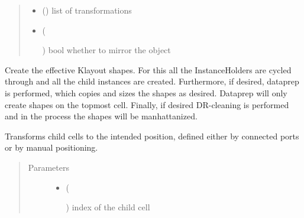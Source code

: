 \documentclass[a4paper,10pt,english]{sphinxmanual}
\begin{document}
\begin{fulllineitems}
\begin{fulllineitems}
\begin{quote}
\begin{description}
\begin{itemize}
\item {} 
 () \textendash{} list of transformations

\item {} 
 (%
\begin{footnote}[59]\sphinxAtStartFootnote
{}
%
\end{footnote}) \textendash{} bool whether to mirror the object

\end{itemize}

\end{description}\end{quote}

\end{fulllineitems}


\begin{fulllineitems}
\label{\detokenize{photonics:photonics.PhotDevice.produce_impl}}
Create the effective Klayout shapes. For this all the InstanceHolders are cycled through and all the child
instances are created. Furthermore, if desired, dataprep is performed, which copies and sizes the shapes as
desired. Dataprep will only create shapes on the topmost cell. Finally, if desired DR-cleaning is performed and
in the process the shapes will be manhattanized.

\end{fulllineitems}


\begin{fulllineitems}
\label{\detokenize{photonics:photonics.PhotDevice.set_transformation}}
Transforms child cells to the intended position, defined either by connected ports or by manual
positioning.
\begin{quote}\begin{description}
\item[{Parameters}] \leavevmode\begin{itemize}
\item {} 
 (%
\begin{footnote}[60]\sphinxAtStartFootnote
{}
%
\end{footnote}) \textendash{} index of the child cell


\end{itemize}
\end{description}
\end{quote}
\end{fulllineitems}
\end{fulllineitems}
\end{document}
